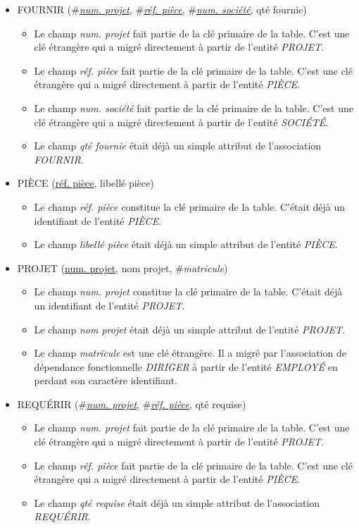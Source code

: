 \documentclass[a4paper]{article}
\newcommand{\relat}[1]{\textsc{#1}}
\newcommand{\attr}[1]{#1}
\newcommand{\prim}[1]{\uline{#1}}
\newcommand{\foreign}[1]{\#\textsl{#1}}
\begin{document}
\begin{itemize}
  \item \relat{FOURNIR} (\foreign{\prim{num. projet}}, \foreign{\prim{réf. pièce}}, \foreign{\prim{num. société}}, \attr{qté fournie})
  \begin{itemize}
    \item Le champ \emph{num. projet} fait partie de la clé primaire de la table. C'est une clé étrangère qui a migré directement à partir de l'entité \emph{PROJET}.
    \item Le champ \emph{réf. pièce} fait partie de la clé primaire de la table. C'est une clé étrangère qui a migré directement à partir de l'entité \emph{PIÈCE}.
    \item Le champ \emph{num. société} fait partie de la clé primaire de la table. C'est une clé étrangère qui a migré directement à partir de l'entité \emph{SOCIÉTÉ}.
    \item Le champ \emph{qté fournie} était déjà un simple attribut de l'association \emph{FOURNIR}.
  \end{itemize}

  \item \relat{PIÈCE} (\prim{réf. pièce}, \attr{libellé pièce})
  \begin{itemize}
    \item Le champ \emph{réf. pièce} constitue la clé primaire de la table. C'était déjà un identifiant de l'entité \emph{PIÈCE}.
    \item Le champ \emph{libellé pièce} était déjà un simple attribut de l'entité \emph{PIÈCE}.
  \end{itemize}

  \item \relat{PROJET} (\prim{num. projet}, \attr{nom projet}, \foreign{matricule})
  \begin{itemize}
    \item Le champ \emph{num. projet} constitue la clé primaire de la table. C'était déjà un identifiant de l'entité \emph{PROJET}.
    \item Le champ \emph{nom projet} était déjà un simple attribut de l'entité \emph{PROJET}.
    \item Le champ \emph{matricule} est une clé étrangère. Il a migré par l'association de dépendance fonctionnelle \emph{DIRIGER} à partir de l'entité \emph{EMPLOYÉ} en perdant son caractère identifiant.
  \end{itemize}

  \item \relat{REQUÉRIR} (\foreign{\prim{num. projet}}, \foreign{\prim{réf. pièce}}, \attr{qté requise})
  \begin{itemize}
    \item Le champ \emph{num. projet} fait partie de la clé primaire de la table. C'est une clé étrangère qui a migré directement à partir de l'entité \emph{PROJET}.
    \item Le champ \emph{réf. pièce} fait partie de la clé primaire de la table. C'est une clé étrangère qui a migré directement à partir de l'entité \emph{PIÈCE}.
    \item Le champ \emph{qté requise} était déjà un simple attribut de l'association \emph{REQUÉRIR}.
  \end{itemize}


\end{itemize}
\end{document}
